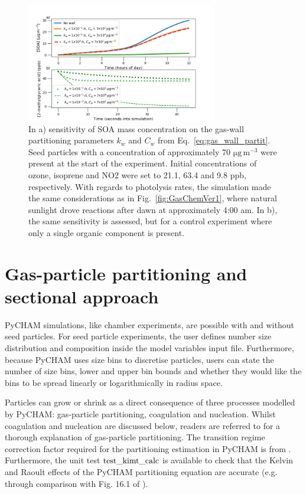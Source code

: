 \documentclass[gmd, manuscript]{copernicus}
\begin{document}
\begin{figure}[t]
\includegraphics[width=8.3cm]{Results/Gaswall_sens_fig.png}
\caption{In a) sensitivity of SOA mass concentration on the gas-wall partitioning parameters $k_{w}$ and $C_{w}$ from Eq.~\ref{eq:gas_wall_partit}.  Seed particles with a concentration of approximately 70 $\mathrm{\mu g\, m^{-3}}$ were present at the start of the experiment.  Initial concentrations of ozone, isoprene and NO2 were set to 21.1, 63.4 and 9.8 ppb, respectively.  With regards to photolysis rates, the simulation made the same considerations as in Fig.~\ref{fig:GasChemVer1}, where natural sunlight drove reactions after dawn at approximately 4:00 am.  In b), the same sensitivity is assessed, but for a control experiment where only a single organic component is present.}
\label{fig:Gaswall_sens_fig}
\end{figure}

\section{Gas-particle partitioning and sectional approach}\label{sec:gp_part}

PyCHAM simulations, like chamber experiments, are possible with and without seed particles.  For seed particle experiments, the user defines number size distribution and composition inside the model variables input file.  Furthermore, because PyCHAM uses size bins to discretise particles, users can state the number of size bins, lower and upper bin bounds and whether they would like the bins to be spread linearly or logarithmically in radius space.  

Particles can grow or shrink as a direct consequence of three processes modelled by PyCHAM: gas-particle partitioning, coagulation and nucleation.  Whilst coagulation and nucleation are discussed below, readers are referred to \citet{Zaveri2008} for a thorough explanation of gas-particle partitioning.  The transition regime correction factor required for the partitioning estimation in PyCHAM is from \citet{Fuchs1971}.  Furthermore, the unit test $\rm{test\_kimt\_calc}$ is available to check that the Kelvin and Raoult effects of the PyCHAM partitioning equation are accurate (e.g. through comparison with Fig. 16.1 of \citet{Jacobson2005}).
\end{document}
